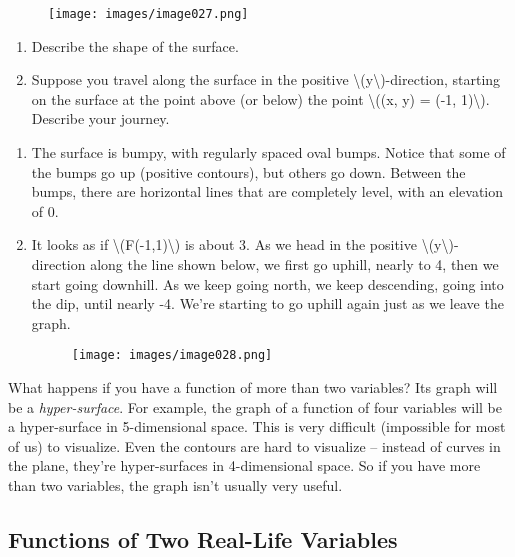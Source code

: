 \begin{figure}
\centering
\texttt{[image: images/image027.png]}
\caption{}
\end{figure}

\begin{enumerate}
\tightlist
\item
  Describe the shape of the surface.
\item
  Suppose you travel along the surface in the positive
  \textbackslash{}(y\textbackslash{})-direction, starting on the surface
  at the point above (or below) the point \textbackslash{}((x, y) = (-1,
  1)\textbackslash{}). Describe your journey.
\end{enumerate}

\begin{enumerate}
\item
  The surface is bumpy, with regularly spaced oval bumps. Notice that
  some of the bumps go up (positive contours), but others go down.
  Between the bumps, there are horizontal lines that are completely
  level, with an elevation of 0.
\item
  It looks as if \textbackslash{}(F(-1,1)\textbackslash{}) is about 3.
  As we head in the positive
  \textbackslash{}(y\textbackslash{})-direction along the line shown
  below, we first go uphill, nearly to 4, then we start going downhill.
  As we keep going north, we keep descending, going into the dip, until
  nearly -4. We're starting to go uphill again just as we leave the
  graph.

  \begin{figure}
  \centering
  \texttt{[image: images/image028.png]}
  \caption{}
  \end{figure}
\end{enumerate}

What happens if you have a function of more than two variables? Its
graph will be a \emph{hyper-surface}. For example, the graph of a
function of four variables will be a hyper-surface in 5-dimensional
space. This is very difficult (impossible for most of us) to visualize.
Even the contours are hard to visualize -- instead of curves in the
plane, they're hyper-surfaces in 4-dimensional space. So if you have
more than two variables, the graph isn't usually very useful.

\hypertarget{functions-of-two-real-life-variables}{%
\subsection{Functions of Two Real-Life
Variables}\label{functions-of-two-real-life-variables}}

